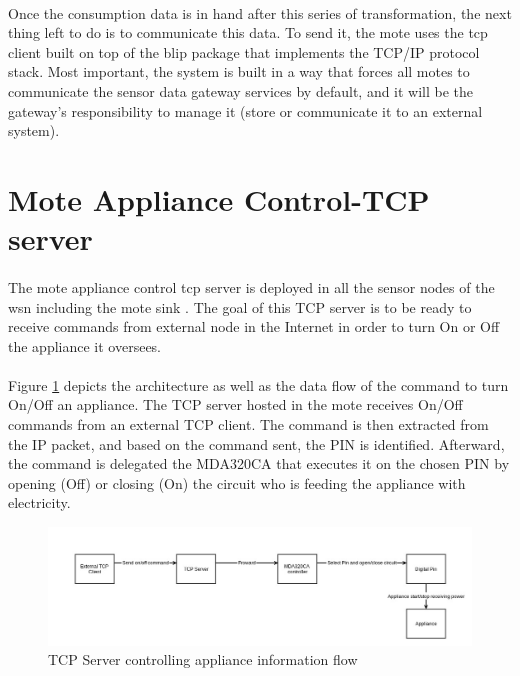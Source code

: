 \documentclass[12pt,a4paper,final]{report}
\begin{document}
\paragraph{}
Once the consumption data is in hand after this series of transformation, the next thing left to do is to communicate this data. To send it, the mote uses the \gls{tcp} client built on top of the \gls{blip} package that implements the TCP/IP protocol stack. Most important, the system is built in a way that forces all motes to communicate the sensor data gateway services by default, and it will be the gateway's responsibility to manage it (store or communicate it to an external system).

\section{ Mote Appliance Control-TCP server}
\paragraph{}
The mote appliance control \gls{tcp} server is deployed in all the sensor nodes of the \gls{wsn} including the mote sink . The goal of this TCP server is to be ready to receive commands from external node in the Internet in order to turn On or Off the appliance it oversees.
\paragraph{}
Figure \ref{fig:appliance_control} depicts the architecture as well as the data flow of the command to turn On/Off an appliance. The TCP server hosted in the mote receives On/Off commands from an external TCP client. The command is then extracted from the IP packet, and based on the command sent, the PIN is identified. Afterward, the command is delegated the MDA320CA that executes it on the chosen PIN by opening (Off) or closing (On) the circuit who is feeding the appliance with electricity.

\begin{figure}[htbp]
\centering
\includegraphics[scale=0.35]{img/appliance_control.jpg}
\caption{TCP Server controlling appliance information flow}
\label{fig:appliance_control}
\end{figure}
\end{document}
